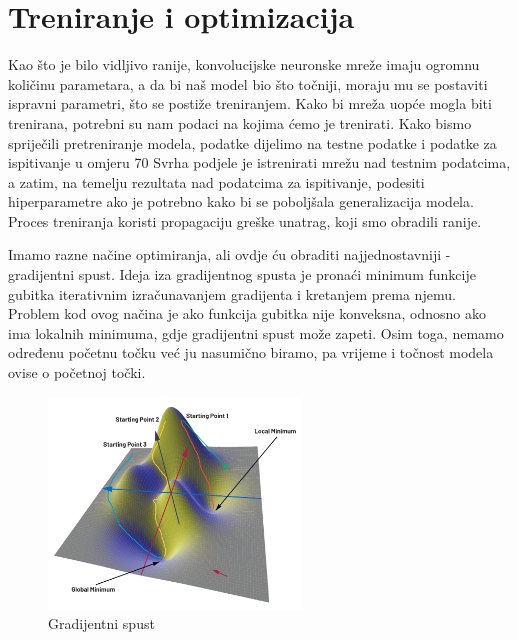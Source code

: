
\chapter{Treniranje i optimizacija}\label{ch:treniranje-i-optimizacija}

Kao što je bilo vidljivo ranije, konvolucijske neuronske mreže imaju ogromnu količinu parametara, a da bi naš model bio što točniji, moraju mu se postaviti ispravni parametri, što se postiže treniranjem.
Kako bi mreža uopće mogla biti trenirana, potrebni su nam podaci na kojima ćemo je trenirati.
Kako bismo spriječili pretreniranje modela, podatke dijelimo na testne podatke i podatke za ispitivanje u omjeru 70%
Svrha podjele je istrenirati mrežu nad testnim podatcima, a zatim, na temelju rezultata nad podatcima za ispitivanje, podesiti hiperparametre ako je potrebno kako bi se poboljšala generalizacija modela.
Proces treniranja koristi propagaciju greške unatrag, koji smo obradili ranije.

Imamo razne načine optimiranja, ali ovdje ću obraditi najjednostavniji - gradijentni spust.
Ideja iza gradijentnog spusta je pronaći minimum funkcije gubitka iterativnim izračunavanjem gradijenta i kretanjem prema njemu.
Problem kod ovog načina je ako funkcija gubitka nije konveksna, odnosno ako ima lokalnih minimuma, gdje gradijentni spust može zapeti.
Osim toga, nemamo određenu početnu točku već ju nasumično biramo, pa vrijeme i točnost modela ovise o početnoj točki.

\FloatBarrier
\begin{figure}[h]
    \centering
    \includegraphics[width=0.6\textwidth]{images/Gradijentni-spust}
    \caption{Gradijentni spust
    \protect\footnotemark}
    \label{fig:slika18}
\end{figure}
\FloatBarrier
{}

